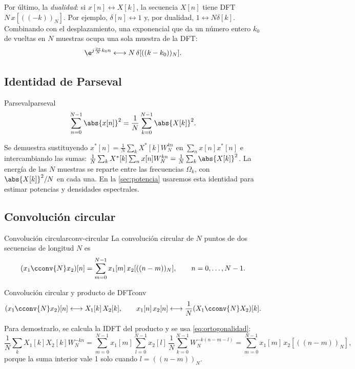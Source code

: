 \documentclass[11pt,a4paper]{scrartcl}
\begin{document}
Por último, la \emph{dualidad}: si $x[n]\leftrightarrow X[k]$, la secuencia $X[n]$ tiene DFT $N\,x[((-k))_N]$. Por ejemplo, $\delta[n]\leftrightarrow1$ y, por dualidad, $1\leftrightarrow N\delta[k]$. Combinando con el desplazamiento, una exponencial que da un número entero $k_0$ de vueltas en $N$ muestras ocupa una sola muestra de la DFT:
\[
  \e^{j\frac{2\pi}{N}k_0n}\longleftrightarrow N\,\delta[((k-k_0))_N].
\]

\subsection{Identidad de Parseval}

\begin{propiedad}{Parseval}{parseval}
  \[
    \sum_{n=0}^{N-1}\abs{x[n]}^2=\frac1N\sum_{k=0}^{N-1}\abs{X[k]}^2.
  \]
\end{propiedad}

Se demuestra sustituyendo $x^*[n]=\frac1N\sum_kX^*[k]W_N^{kn}$ en $\sum_nx[n]x^*[n]$ e intercambiando las sumas: $\frac1N\sum_kX^*[k]\sum_nx[n]W_N^{kn}=\frac1N\sum_k\abs{X[k]}^2$. La energía de las $N$ muestras se reparte entre las frecuencias $\Omega_k$, con $\abs{X[k]}^2/N$ en cada una. En la \cref{sec:potencia} usaremos esta identidad para estimar potencias y densidades espectrales.

\subsection{Convolución circular}

\begin{definicion}{Convolución circular}{conv-circular}
  La convolución circular de $N$ puntos de dos secuencias de longitud $N$ es
  \[
    (x_1\cconv{N}x_2)[n]=\sum_{m=0}^{N-1}x_1[m]\,x_2[((n-m))_N],\qquad n=0,\dots,N-1.
  \]
\end{definicion}

\begin{propiedad}{Convolución circular y producto de DFT}{conv}
  \[
    (x_1\cconv{N}x_2)[n]\longleftrightarrow X_1[k]\,X_2[k],\qquad x_1[n]\,x_2[n]\longleftrightarrow\frac1N(X_1\cconv{N}X_2)[k].
  \]
\end{propiedad}

Para demostrarlo, se calcula la IDFT del producto y se usa \eqref{eq:ortogonalidad}:
\[
  \frac1N\sum_{k}X_1[k]X_2[k]W_N^{-kn}
  =\sum_{m=0}^{N-1}x_1[m]\sum_{l=0}^{N-1}x_2[l]\,\frac1N\sum_{k=0}^{N-1}W_N^{-k(n-m-l)}
  =\sum_{m=0}^{N-1}x_1[m]\,x_2[((n-m))_N],
\]
porque la suma interior vale 1 solo cuando $l=((n-m))_N$.
\end{document}
